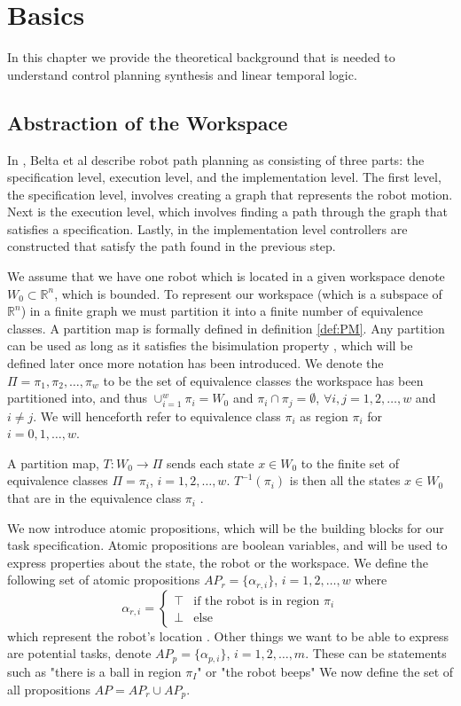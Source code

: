 \section{Basics}
In this chapter we provide the theoretical background that is needed to understand control planning synthesis and linear temporal logic. 
\subsection{Abstraction of the Workspace}
In \cite{belta07}, Belta et al describe robot path planning as consisting of three parts: the specification level, execution level, and the implementation level. The first level, the specification level, involves creating a graph that represents the robot motion. Next is the execution level, which involves finding a path through the graph that satisfies a specification. Lastly, in the implementation level controllers are constructed that satisfy the path found in the previous step. 

We assume that we have one robot which is located in a given workspace denote $W_0 \subset \mathbb{R}^n$, which is bounded. To represent our workspace (which is a subspace of $\mathbb{R}^n$) in a finite graph we must partition it into a finite number of equivalence classes. A partition map is formally defined in definition \ref{def:PM}. Any partition can be used as long as it satisfies the bisimulation property \cite{belta04}, which will be defined later once more notation has been introduced. We denote the $\Pi = {\pi_1, \pi_2, \dots, \pi_w}$ to be the set of equivalence classes the workspace has been partitioned into, and thus $\cup_{i=1}^w \pi_i = W_0$ and $\pi_i \cap \pi_j = \emptyset$, $\forall i,j=1,2,\dots,w$ and $i\neq j$. We will henceforth refer to equivalence class $\pi_i$ as region $\pi_i$ for $i = 0,1,\dots, w$. 

\begin{definition}
\label{def:PM}
A partition map, $T: W_0 \rightarrow \Pi$ sends each state $x \in W_0$ to the finite set of equivalence classes $\Pi = {\pi_i}$,  $i = 1,2,\dots ,w$. $T^{-1}(\pi_i)$ is then all the states $x \in W_0$ that are in the equivalence class $\pi_i$ \cite{fainekos05}. 
\end{definition} 

We now introduce atomic propositions, which will be the building blocks for our task specification. Atomic propositions are boolean variables, and will be used to express properties about the state, the robot or the workspace. We define the following set of atomic propositions $AP_r = \{\alpha_{r,i}\}$, $i=1,2,\dots,w$ where 
\[\alpha_{r,i} =  \begin{cases}
\top & \text{if the robot is in region $\pi_i$} \\
\bot & \text{else}
\end{cases}
\]
which represent the robot's location \cite{guo15}. Other things we want to be able to express are potential tasks, denote $AP_p = \{\alpha_{p,i}\}$, $i=1,2,\dots,m$. These can be statements such as "there is a ball in region $\pi_I$" or "the robot beeps"
We now define the set of all propositions $AP = AP_r \cup AP_p$.


